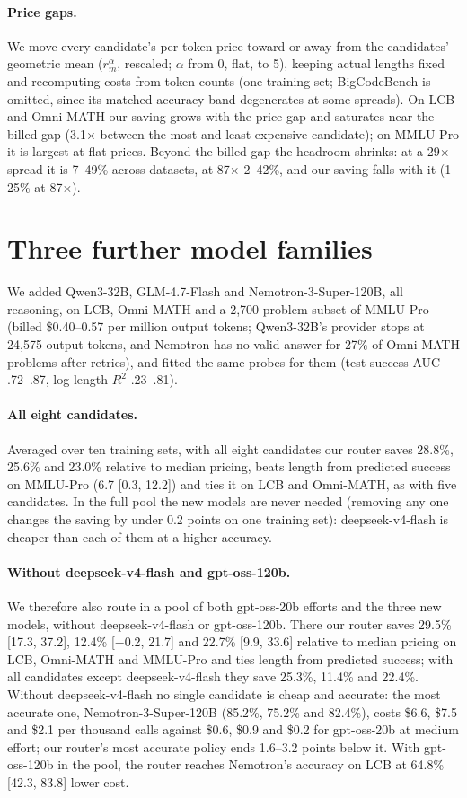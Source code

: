 \documentclass[10pt]{article}
\begin{document}
\paragraph{Price gaps.} We move every candidate's per-token price toward or away from the candidates' geometric mean ($r_m^\alpha$, rescaled; $\alpha$ from 0, flat, to 5), keeping actual lengths fixed and recomputing costs from token counts (one training set; BigCodeBench is omitted, since its matched-accuracy band degenerates at some spreads). On LCB and Omni-MATH our saving grows with the price gap and saturates near the billed gap (3.1$\times$ between the most and least expensive candidate); on MMLU-Pro it is largest at flat prices. Beyond the billed gap the headroom shrinks: at a 29$\times$ spread it is 7--49\% across datasets, at 87$\times$ 2--42\%, and our saving falls with it (1--25\% at 87$\times$).


\FloatBarrier
\section{Three further model families}\label{app:families}
We added Qwen3-32B, GLM-4.7-Flash and Nemotron-3-Super-120B, all reasoning, on LCB, Omni-MATH and a 2,700-problem subset of MMLU-Pro (billed \$0.40--0.57 per million output tokens; Qwen3-32B's provider stops at 24,575 output tokens, and Nemotron has no valid answer for 27\% of Omni-MATH problems after retries), and fitted the same probes for them (test success AUC .72--.87, log-length $R^2$ .23--.81).

\paragraph{All eight candidates.} Averaged over ten training sets, with all eight candidates our router saves 28.8\%, 25.6\% and 23.0\% relative to median pricing, beats length from predicted success on MMLU-Pro (6.7 [0.3, 12.2]) and ties it on LCB and Omni-MATH, as with five candidates. In the full pool the new models are never needed (removing any one changes the saving by under 0.2 points on one training set): deepseek-v4-flash is cheaper than each of them at a higher accuracy.

\paragraph{Without deepseek-v4-flash and gpt-oss-120b.} We therefore also route in a pool of both gpt-oss-20b efforts and the three new models, without deepseek-v4-flash or gpt-oss-120b. There our router saves 29.5\% [17.3, 37.2], 12.4\% [$-$0.2, 21.7] and 22.7\% [9.9, 33.6] relative to median pricing on LCB, Omni-MATH and MMLU-Pro and ties length from predicted success; with all candidates except deepseek-v4-flash they save 25.3\%, 11.4\% and 22.4\%. Without deepseek-v4-flash no single candidate is cheap and accurate: the most accurate one, Nemotron-3-Super-120B (85.2\%, 75.2\% and 82.4\%), costs \$6.6, \$7.5 and \$2.1 per thousand calls against \$0.6, \$0.9 and \$0.2 for gpt-oss-20b at medium effort; our router's most accurate policy ends 1.6--3.2 points below it. With gpt-oss-120b in the pool, the router reaches Nemotron's accuracy on LCB at 64.8\% [42.3, 83.8] lower cost.
\end{document}
